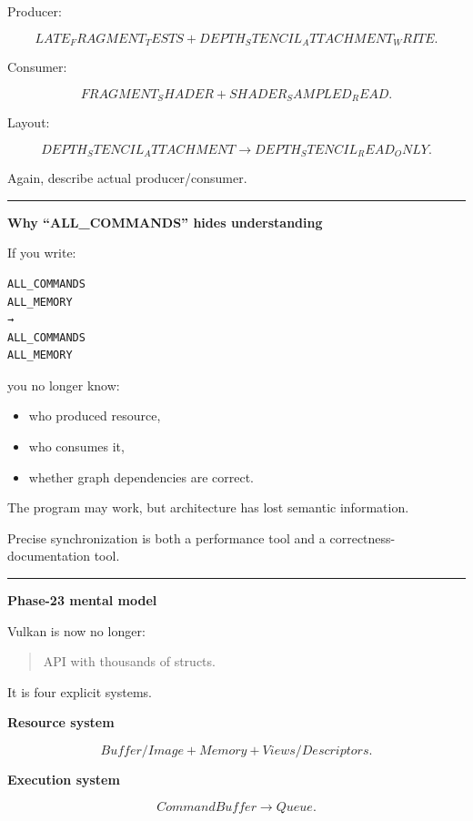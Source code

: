 Producer:

\[
LATE_FRAGMENT_TESTS
+
DEPTH_STENCIL_ATTACHMENT_WRITE.
\]

Consumer:

\[
FRAGMENT_SHADER
+
SHADER_SAMPLED_READ.
\]

Layout:

\[
DEPTH_STENCIL_ATTACHMENT
\rightarrow
DEPTH_STENCIL_READ_ONLY.
\]

Again, describe actual producer/consumer.

\begin{center}\rule{0.5\linewidth}{0.5pt}\end{center}

\textbf{Why ``ALL\_COMMANDS'' hides understanding}

If you write:

\begin{verbatim}
ALL_COMMANDS
ALL_MEMORY
→
ALL_COMMANDS
ALL_MEMORY
\end{verbatim}

you no longer know:

\begin{itemize}
\tightlist
\item
  who produced resource,
\item
  who consumes it,
\item
  whether graph dependencies are correct.
\end{itemize}

The program may work, but architecture has lost semantic information.

Precise synchronization is both a performance tool and a correctness-documentation tool.

\begin{center}\rule{0.5\linewidth}{0.5pt}\end{center}

\textbf{Phase-23 mental model}

Vulkan is now no longer:

\begin{quote}
API with thousands of structs.
\end{quote}

It is four explicit systems.

\textbf{Resource system}

\[
Buffer/Image
+
Memory
+
Views/Descriptors.
\]

\textbf{Execution system}

\[
CommandBuffer
\rightarrow
Queue.
\]

